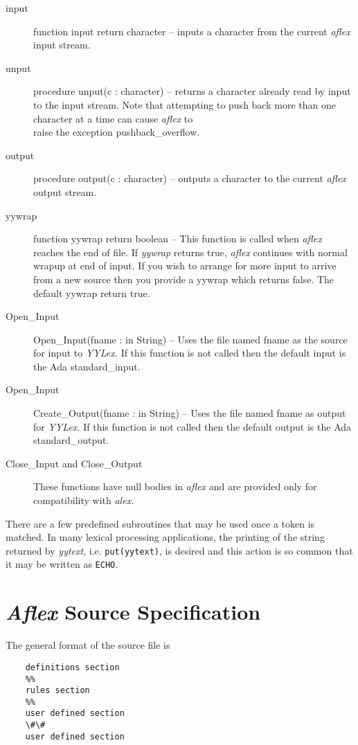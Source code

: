 \begin{description}
\item[input] function input return character -- inputs a character from the
current {\sl aflex} input stream.
\item[unput] procedure unput(c : character) -- returns a character
already read by input to the input stream.  Note that attempting to
push back more than one character at a time can cause {\sl aflex} to\\
raise the exception {\sc pushback\_overflow.}
\item[output] procedure output(c : character) -- outputs a character to the
current {\sl aflex} output stream.
\item[yywrap] function yywrap return boolean -- This function is
called when {\sl aflex} reaches the end of file.  If {\it yywrap}
returns true, {\sl aflex} continues with normal wrapup at end of
input.  If you wish to arrange for more input to arrive from a new
source then you provide a yywrap which returns false.  The default
yywrap return true.
\item[Open\_Input] Open\_Input(fname : in String) -- Uses the file named
fname as the source for input to {\it YYLex.}  If this function is not
called then the default input is the Ada {\sc standard\_input.}
\item[Open\_Input] Create\_Output(fname : in String) -- Uses the file named
fname as output for {\it YYLex.}  If this function is not
called then the default output is the Ada {\sc standard\_output}.
\item[Close\_Input and Close\_Output]  These functions have null
bodies in {\sl aflex} and are provided only for compatibility with
{\sl alex.}
\end{description}

\mysk
There are a few predefined subroutines that may be used once a token
is matched.  In many lexical processing applications, the printing of
the string returned by {\sl yytext}, i.e. {\tt put(yytext)}, is desired 
and this action is so common that it may be written as {\tt ECHO}.

\newpage
\section{{\sl Aflex} Source Specification}
\label {specformat}

The general format of the source file is

\small
\begin{verbatim}
    definitions section
    %% 
    rules section
    %% 
    user defined section
    \#\#
    user defined section
\end{verbatim}
\normalsize

